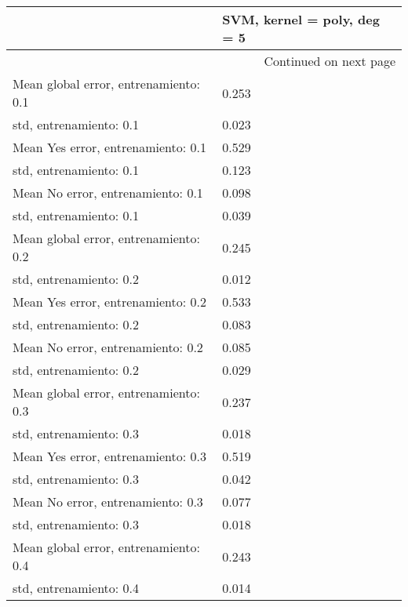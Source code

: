\begin{longtable}{p{4cm}|p{1.5cm}}
\toprule
{} &  SVM, kernel = poly, deg = 5 \\
\midrule
\endhead
\midrule
\multicolumn{2}{r}{{Continued on next page}} \\
\midrule
\endfoot

\bottomrule
\endlastfoot
Mean global error, entrenamiento: 0.1 &                        0.253 \\
std, entrenamiento: 0.1               &                        0.023 \\
Mean Yes error, entrenamiento: 0.1    &                        0.529 \\
std, entrenamiento: 0.1               &                        0.123 \\
Mean No error, entrenamiento: 0.1     &                        0.098 \\
std, entrenamiento: 0.1               &                        0.039 \\
Mean global error, entrenamiento: 0.2 &                        0.245 \\
std, entrenamiento: 0.2               &                        0.012 \\
Mean Yes error, entrenamiento: 0.2    &                        0.533 \\
std, entrenamiento: 0.2               &                        0.083 \\
Mean No error, entrenamiento: 0.2     &                        0.085 \\
std, entrenamiento: 0.2               &                        0.029 \\
Mean global error, entrenamiento: 0.3 &                        0.237 \\
std, entrenamiento: 0.3               &                        0.018 \\
Mean Yes error, entrenamiento: 0.3    &                        0.519 \\
std, entrenamiento: 0.3               &                        0.042 \\
Mean No error, entrenamiento: 0.3     &                        0.077 \\
std, entrenamiento: 0.3               &                        0.018 \\
Mean global error, entrenamiento: 0.4 &                        0.243 \\
std, entrenamiento: 0.4               &                        0.014 \\

\end{longtable}
